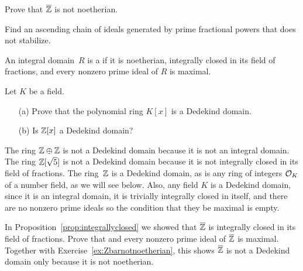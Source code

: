 \begin{exercise}\label{ex:Zbarnotnoetherian}
  Prove that $\overline{\mathbb{Z}}$ is not noetherian.

  \begin{hint}
    Find an ascending chain of ideals generated by prime fractional powers that does not stabilize.
  \end{hint}
\end{exercise}

\begin{definition}
  An integral domain~$R$ is a  if it is noetherian,
  integrally closed in its field of fractions, and every nonzero prime
  ideal of $R$ is maximal.
\end{definition}

\begin{exercise}
  Let $K$ be a field.
  \begin{enumerate}
    \item[(a)] Prove that the polynomial ring $K[x]$ is a Dedekind domain.
    \item[(b)] Is $\mathbb{Z}[x]$ a Dedekind domain?
  \end{enumerate}
\end{exercise}

The ring $\mathbb{Z}\oplus \mathbb{Z}$ is not a Dedekind domain because it is not an
integral domain.  The ring $\mathbb{Z}[\sqrt{5}]$ is not a Dedekind domain
because it is not integrally closed in its field of fractions.  The
ring~$\mathbb{Z}$ is a Dedekind domain, as is any ring of integers $\mathcal{O}_K$ of a
number field, as we will see below.  Also, any field $K$ is a Dedekind
domain, since it is an integral domain, it is trivially integrally
closed in itself, and there are no nonzero prime ideals so the
condition that they be maximal is empty.

\begin{exercise}
  In Proposition~\ref{prop:integrallyclosed} we showed
  that $\overline{\mathbb{Z}}$ is integrally closed in its field of fractions.
  Prove that and every nonzero prime ideal of $\overline{\mathbb{Z}}$
  is maximal. Together with Exercise~\ref{ex:Zbarnotnoetherian},
  this shows $\overline{\mathbb{Z}}$ is not a Dedekind domain only because it
  is not noetherian.
\end{exercise}

